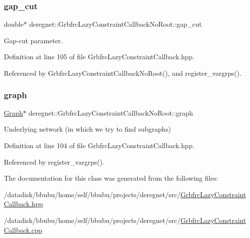 \subsubsection{\texorpdfstring{gap\+\_\+cut}{gap\_cut}}
{\footnotesize\ttfamily double$\ast$ deregnet\+::\+Grbfrc\+Lazy\+Constraint\+Callback\+No\+Root\+::gap\+\_\+cut\hspace{0.3cm}{\ttfamily [private]}}



Gap-\/cut parameter. 



Definition at line 105 of file Grbfrc\+Lazy\+Constraint\+Callback.\+hpp.



Referenced by Grbfrc\+Lazy\+Constraint\+Callback\+No\+Root(), and register\+\_\+vargrps().

\mbox{\label{classderegnet_1_1GrbfrcLazyConstraintCallbackNoRoot_a0c5b7bfa966879cc74fea0ea1c5c864c}} 
\subsubsection{\texorpdfstring{graph}{graph}}
{\footnotesize\ttfamily \hyperlink{namespacederegnet_a55b76c55bbabc682cbc61f8b9948799e}{Graph}$\ast$ deregnet\+::\+Grbfrc\+Lazy\+Constraint\+Callback\+No\+Root\+::graph\hspace{0.3cm}{\ttfamily [private]}}



Underlying network (in which we try to find subgraphs) 



Definition at line 104 of file Grbfrc\+Lazy\+Constraint\+Callback.\+hpp.



Referenced by register\+\_\+vargrps().



The documentation for this class was generated from the following files\+:\begin{DoxyCompactItemize}
\item 
/datadisk/bbubu/home/self/bbubu/projects/deregnet/src/\hyperlink{GrbfrcLazyConstraintCallback_8hpp}{Grbfrc\+Lazy\+Constraint\+Callback.\+hpp}\item 
/datadisk/bbubu/home/self/bbubu/projects/deregnet/src/\hyperlink{GrbfrcLazyConstraintCallback_8cpp}{Grbfrc\+Lazy\+Constraint\+Callback.\+cpp}\end{DoxyCompactItemize}
